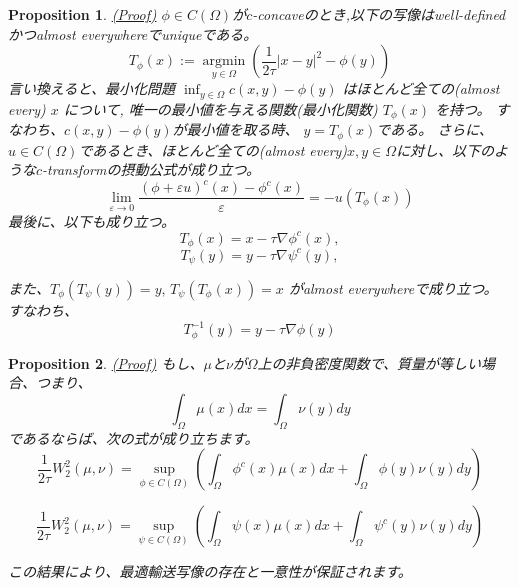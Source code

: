 \documentclass{jsarticle}
\newtheorem{prop}{Proposition}[section]
\theoremstyle{definition}
\begin{document}
\begin{prop}
    \label{prop:transport map}
    \hyperlink{proof:prop:transport map}{(Proof)}
    $\phi \in C(\Omega)$が$c$-concaveのとき,以下の写像はwell-definedかつalmost everywhereでuniqueである。
    \begin{equation}
            T_\phi(x):= \underset{y \in \Omega} {\operatorname{argmin}}\left( \frac{1}{2 \tau} |x - y|^2 - \phi(y) \right) 
    \end{equation}
    言い換えると、最小化問題 $\inf_{y \in \Omega} c(x, y) - \phi(y)$ はほとんど全ての(almost every) $x$ について,
    唯一の最小値を与える関数(最小化関数) $T_\phi(x)$ を持つ。
    すなわち、$c(x, y) - \phi(y)$が最小値を取る時、 $y = T_\phi(x)$である。
    さらに、$u \in C(\Omega)$であるとき、ほとんど全ての(almost every)$x, y \in \Omega$に対し、以下のような$c$-transformの摂動公式が成り立つ。
    \begin{equation}
        \lim_{\varepsilon \to 0} \frac{(\phi + \varepsilon u)^c(x) - \phi^c(x)}{\varepsilon} = - u(T_\phi(x))
    \end{equation}
    最後に、以下も成り立つ。
    $$
        T_\phi(x) = x - \tau \nabla \phi^c(x),
    $$
    $$
        T_\psi(y) = y - \tau \nabla \psi^c(y),
    $$
    {\color{teal}
    また、$T_\phi(T_\psi(y)) = y,\, T_\psi(T_\phi(x)) = x$ がalmost everywhereで成り立つ。
    すなわち、
    $$
        T_\phi^{-1}(y) = y - \tau \nabla \phi(y) 
    $$

    }

    
\end{prop}


\begin{prop}
    \label{prop:wasserstein}
    \hyperlink{proof:prop:wasserstein}{(Proof)}
    もし、$\mu$と$\nu$が$\Omega$上の非負密度関数で、質量が等しい場合、つまり、
    \[
        \int_{\Omega} \mu(x)dx = \int_{\Omega} \nu(y)dy
    \]
    であるならば、次の式が成り立ちます。
    \[
        \frac{1}{2\tau}W_2^2(\mu, \nu) = \sup_{\phi \in C(\Omega)} \left( \int_{\Omega} \phi^c(x) \mu(x)dx + \int_{\Omega} \phi(y) \nu(y)dy \right) 
    \]

    \[
        \frac{1}{2\tau}W_2^2(\mu, \nu) = \sup_{\psi \in C(\Omega)} \left( \int_{\Omega} \psi(x) \mu(x)dx + \int_{\Omega} \psi^c (y) \nu(y)dy \right) 
    \]


この結果により、最適輸送写像の存在と一意性が保証されます。
\end{prop}
\end{document}
